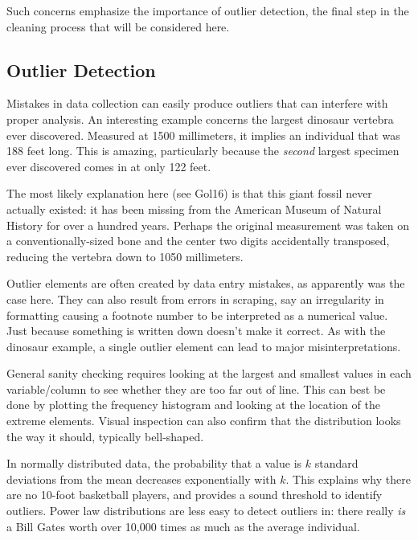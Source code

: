 \documentclass[10pt]{article}
\begin{document}
Such concerns emphasize the importance of outlier detection, the final step in the cleaning process that will be considered here.

\subsection*{Outlier Detection}

Mistakes in data collection can easily produce outliers that can interfere with proper analysis. An interesting example concerns the largest dinosaur vertebra ever discovered. Measured at 1500 millimeters, it implies an individual that was 188 feet long. This is amazing, particularly because the \textit{second} largest specimen ever discovered comes in at only 122 feet.

The most likely explanation here (see Gol16) is that this giant fossil never actually existed: it has been missing from the American Museum of Natural History for over a hundred years. Perhaps the original measurement was taken on a conventionally-sized bone and the center two digits accidentally transposed, reducing the vertebra down to 1050 millimeters.

Outlier elements are often created by data entry mistakes, as apparently was the case here. They can also result from errors in scraping, say an irregularity in formatting causing a footnote number to be interpreted as a numerical value. Just because something is written down doesn't make it correct. As with the dinosaur example, a single outlier element can lead to major misinterpretations.


General sanity checking requires looking at the largest and smallest values in each variable/column to see whether they are too far out of line. This can best be done by plotting the frequency histogram and looking at the location of the extreme elements. Visual inspection can also confirm that the distribution looks the way it should, typically bell-shaped.

In normally distributed data, the probability that a value is $k$ standard deviations from the mean decreases exponentially with $k$. This explains why there are no 10-foot basketball players, and provides a sound threshold to identify outliers. Power law distributions are less easy to detect outliers in: there really \textit{is} a Bill Gates worth over 10,000 times as much as the average individual.
\end{document}
